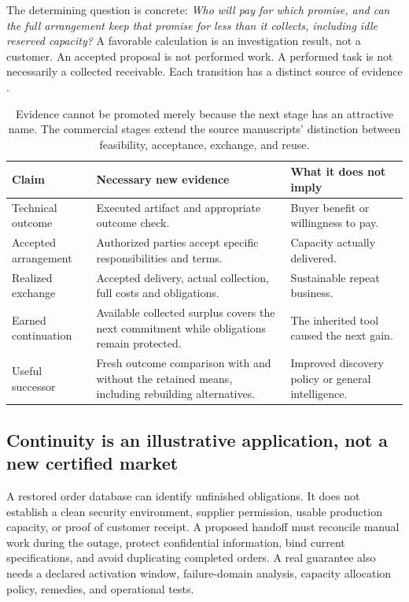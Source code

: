 \documentclass[11pt,a4paper]{article}
\begin{document}
The determining question is concrete: \emph{Who will pay for which promise, and can the full arrangement keep that promise for less than it collects, including idle reserved capacity?} A favorable calculation is an investigation result, not a customer. An accepted proposal is not performed work. A performed task is not necessarily a collected receivable. Each transition has a distinct source of evidence \cite[Secs.~2, 4]{economy}.

\begin{table}[H]\small
\begin{tabularx}{\textwidth}{@{}L{30mm}YY@{}}\toprule
\textbf{Claim} & \textbf{Necessary new evidence} & \textbf{What it does not imply}\\\midrule
Technical outcome & Executed artifact and appropriate outcome check. & Buyer benefit or willingness to pay.\\
Accepted arrangement & Authorized parties accept specific responsibilities and terms. & Capacity actually delivered.\\
Realized exchange & Accepted delivery, actual collection, full costs and obligations. & Sustainable repeat business.\\
Earned continuation & Available collected surplus covers the next commitment while obligations remain protected. & The inherited tool caused the next gain.\\
Useful successor & Fresh outcome comparison with and without the retained means, including rebuilding alternatives. & Improved discovery policy or general intelligence.\\\bottomrule
\end{tabularx}
\caption{Evidence cannot be promoted merely because the next stage has an attractive name. The commercial stages extend the source manuscripts' distinction between feasibility, acceptance, exchange, and reuse.}
\end{table}

\subsection{Continuity is an illustrative application, not a new certified market}
A restored order database can identify unfinished obligations. It does not establish a clean security environment, supplier permission, usable production capacity, or proof of customer receipt. A proposed handoff must reconcile manual work during the outage, protect confidential information, bind current specifications, and avoid duplicating completed orders. A real guarantee also needs a declared activation window, failure-domain analysis, capacity allocation policy, remedies, and operational tests.
\end{document}

